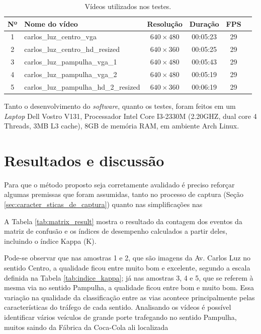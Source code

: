 \begin{table}[ht]
  \caption{Vídeos utilizados nos testes.}
  \label{tab:videos_teste}
  \begin{center}
    \begin{tabular}{clcccc}
    \toprule
    \textbf{Nº} & \textbf{Nome do vídeo} & \textbf{Resolução} & \textbf{Duração} & \textbf{FPS} \\
    \midrule
      1 & carlos\_luz\_centro\_vga & $ 640\times 480 $ & 00:05:23 & 29 \\
      2 & carlos\_luz\_centro\_hd\_resized & $ 640\times 360 $ & 00:05:25 & 29 \\
      3 & carlos\_luz\_pampulha\_vga\_1 & $ 640\times 480 $ & 00:05:43 & 29 \\
      4 & carlos\_luz\_pampulha\_vga\_2 & $ 640\times 480 $ & 00:05:19 & 29 \\
      5 & carlos\_luz\_pampulha\_hd\_2\_resized & $ 640\times 360 $ & 00:06:19 & 29 \\
    \bottomrule
    \end{tabular}
  \end{center}
\end{table}

Tanto o desenvolvimento do \textit{software}, quanto os testes, foram feitos em um \textit{Laptop} Dell Vostro V131, Processador Intel Core I3-2330M (2.20GHZ, dual core 4 Threads, 3MB L3 cache), 8GB de memória RAM, em ambiente Arch Linux.


\section{Resultados e discussão} %
\label{sec:resultados_e_discuss_o}

Para que o método proposto seja corretamente avalidado é preciso reforçar algumas premissas que foram assumidas, tanto no processo de captura (Seção \ref{sec:caracter_sticas_de_captura}) quanto nas simplificações nas

A Tabela \ref{tab:matrix_result} mostra o resultado da contagem dos eventos da matriz de confusão e os índices de desempenho calculados a partir deles, incluindo o índice Kappa (K). 

Pode-se observar que nas amostras 1 e 2, que são imagens da Av. Carlos Luz no sentido Centro, a qualidade ficou entre muito bom e excelente, segundo a escala definida na Tabela \ref{tab:indice_kappa}; já  nas amostras 3, 4 e 5, que se referem à mesma via no sentido Pampulha, a qualidade ficou entre bom e muito bom. Essa variação na qualidade da classificação entre as vias acontece principalmente pelas características do tráfego de cada sentido. Analisando os vídeos é possível identificar vários veículos de grande porte trafegando no sentido Pampulha, muitos saindo da Fábrica da Coca-Cola ali localizada 

